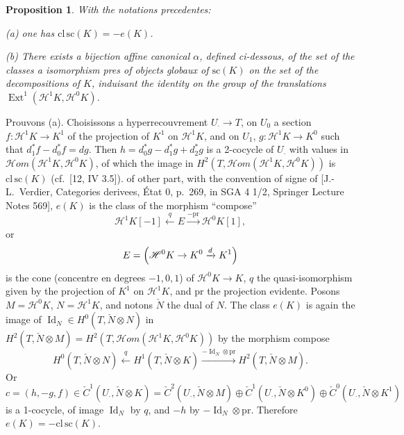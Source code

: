 \documentclass[12pt,a4paper]{article}
\theoremstyle{plain}
\newtheorem{proposition}[theorem]{Proposition}
\theoremstyle{definition}
\theoremstyle{remark}
\DeclareMathOperator{\Ext}{Ext}
\DeclareMathOperator{\Id}{Id}
\begin{document}
\begin{proposition}\label{prop:3.3}
With the notations precedentes:

\textup{(a)} one has $\mathrm{cl}\,\mathrm{sc}(K) = -e(K)$.

\textup{(b)} There exists a bijection affine canonical $\alpha$, defined ci-dessous, of the set of the classes a isomorphism pres of objects globaux of $\mathrm{sc}(K)$ on the set of the decompositions of $K$, induisant the identity on the group of the translations $\Ext^1(\mathscr{H}^1 K, \mathscr{H}^0 K)$.
\end{proposition}

Prouvons (a). Choisissons a hyperrecouvrement $U_\cdot \to T$, on $U_0$ a section $f: \mathscr{H}^1 K \to K^1$ of the projection of $K^1$ on $\mathscr{H}^1 K$, and on $U_1$, $g: \mathscr{H}^1 K \to K^0$ such that $d_1^* f - d_0^* f = dg$. Then $h = d_0^* g - d_1^* g + d_2^* g$ is a 2-cocycle of $U_\cdot$ with values in $\mathscr{H}om(\mathscr{H}^1 K, \mathscr{H}^0 K)$, of which the image in $H^2(T, \mathscr{H}om(\mathscr{H}^1 K, \mathscr{H}^0 K))$ is $\mathrm{cl}\, \mathrm{sc}(K)$ (cf.~[12, IV 3.5]). of other part, with the convention of signe of [J.-L.~Verdier, Categories derivees, \'Etat 0, p.~269, in SGA 4 1/2, Springer Lecture Notes 569], $e(K)$ is the class of the morphism ``compose''
\[
\mathscr{H}^1 K[-1] \xleftarrow{q} E \xrightarrow{-\mathrm{pr}} \mathscr{H}^0 K[1],
\]
or
\[
E = \Bigl( \mathscr{H}^0 K \to K^0 \xrightarrow{d} K^1 \Bigr)
\]
is the cone (concentre en degrees $-1, 0, 1$) of $\mathscr{H}^0 K \to K$, $q$ the quasi-isomorphism given by the projection of $K^1$ on $\mathscr{H}^1 K$, and $\mathrm{pr}$ the projection evidente. Posons $M = \mathscr{H}^0 K$, $N = \mathscr{H}^1 K$, and notons $\check{N}$ the dual of $N$. The class $e(K)$ is again the image of $\Id_N \in H^0(T, \check{N} \otimes N)$ in $H^2(T, \check{N} \otimes M) = H^2(T, \mathscr{H}om(\mathscr{H}^1 K, \mathscr{H}^0 K))$ by the morphism compose
\[
H^0(T, \check{N} \otimes N) \xleftarrow{q} H^1(T, \check{N} \otimes K) \xrightarrow{-\Id_N \otimes \mathrm{pr}} H^2(T, \check{N} \otimes M).
\]
Or
\[
c = (h, -g, f) \in \check{C}^1(U_\cdot, \check{N} \otimes K) = \check{C}^2(U_\cdot, \check{N} \otimes M) \oplus \check{C}^1(U_\cdot, \check{N} \otimes K^0) \oplus \check{C}^0(U_\cdot, \check{N} \otimes K^1)
\]
is a 1-cocycle, of image $\Id_N$ by $q$, and $-h$ by $-\Id_N \otimes \mathrm{pr}$. Therefore $e(K) = -\mathrm{cl}\, \mathrm{sc}(K)$.
\end{document}
